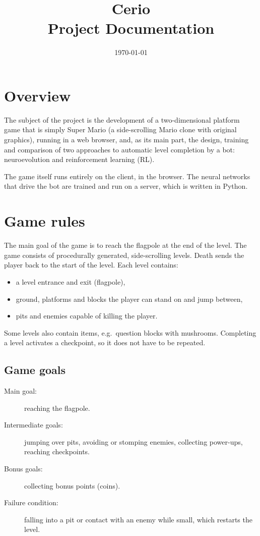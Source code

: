 \documentclass[11pt,a4paper]{article}
\title{Cerio\\[0.3em]\large Project Documentation}
\author{}
\date{\today}
\begin{document}
\maketitle
\tableofcontents
\newpage

\section{Overview}

The subject of the project is the development of a two-dimensional platform game that is
simply Super Mario (a side-scrolling Mario clone with original graphics), running in a web
browser, and, as its main part, the design, training and comparison of two approaches to
automatic level completion by a bot: neuroevolution and reinforcement learning (RL).

The game itself runs entirely on the client, in the browser. The neural networks that drive
the bot are trained and run on a server, which is written in Python.

\section{Game rules}

The main goal of the game is to reach the flagpole at the end of the level. The game consists
of procedurally generated, side-scrolling levels. Death sends the player back to the start of
the level. Each level contains:
\begin{itemize}
  \item a level entrance and exit (flagpole),
  \item ground, platforms and blocks the player can stand on and jump between,
  \item pits and enemies capable of killing the player.
\end{itemize}
Some levels also contain items, e.g.\ question blocks with mushrooms. Completing a level
activates a checkpoint, so it does not have to be repeated.

\subsection{Game goals}

\begin{description}
  \item[Main goal:] reaching the flagpole.
  \item[Intermediate goals:] jumping over pits, avoiding or stomping enemies, collecting
        power-ups, reaching checkpoints.
  \item[Bonus goals:] collecting bonus points (coins).
  \item[Failure condition:] falling into a pit or contact with an enemy while small, which
        restarts the level.
\end{description}
\end{document}

